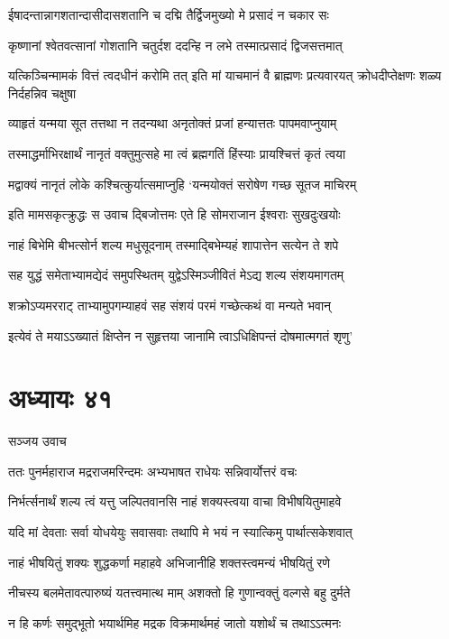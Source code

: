 \twolineshloka
{ईषादन्तान्नागशतान्दासीदासशतानि च}
{दद्मि तैर्द्विजमुख्यो मे प्रसादं न चकार सः}


\twolineshloka
{कृष्णानां श्वेतवत्सानां गोशतानि चतुर्दश}
{ददन्हि न लभे तस्मात्प्रसादं द्विजसत्तमात्}


\threelineshloka
{यत्किञ्चिन्मामकं वित्तं त्वदधीनं करोमि तत्}
{इति मां याचमानं वै ब्राह्मणः प्रत्यवारयत्}
{क्रोधदीप्तेक्षणः शळ्य निर्दहन्निव चक्षुषा}


\twolineshloka
{व्याहृतं यन्मया सूत तत्तथा न तदन्यथा}
{अनृतोक्तं प्रजां हन्यात्ततः पापमवाप्नुयाम्}


\twolineshloka
{तस्माद्धर्माभिरक्षार्थं नानृतं वक्तुमुत्सहे}
{मा त्वं ब्रह्मगतिं हिंस्याः प्रायश्चित्तं कृतं त्वया}


\twolineshloka
{मद्वाक्यं नानृतं लोके कश्चित्कुर्यात्समाप्नुहि}
{`यन्मयोक्तं सरोषेण गच्छ सूतज माचिरम्}


\twolineshloka
{इति मामसकृत्क्रुद्धः स उवाच द्बिजोत्तमः}
{एते हि सोमराजान ईश्वराः सुखदुःखयोः}


\twolineshloka
{नाहं बिभेमि बीभत्सोर्न शल्य मधुसूदनाम्}
{तस्माद्बिभेम्यहं शापात्तेन सत्येन ते शपे}


\twolineshloka
{सह युद्धं समेताभ्यामद्येदं समुपस्थितम्}
{युद्वेऽस्मिञ्जीवितं मेऽद्य शल्य संशयमागतम्}


\twolineshloka
{शक्रोऽप्यमरराट् ताभ्यामुपगम्याहवं सह}
{संशयं परमं गच्छेत्कथं वा मन्यते भवान्}


\twolineshloka
{इत्येवं ते मयाऽऽख्यातं क्षिप्तेन न सुहृत्तया}
{जानामि त्वाऽधिक्षिपन्तं दोषमात्मगतं शृणु'}


\chapter{अध्यायः ४१}
\twolineshloka
{सञ्जय उवाच}
{}


\twolineshloka
{ततः पुनर्महाराज मद्रराजमरिन्दमः}
{अभ्यभाषत राधेयः सन्निवार्योत्तरं वचः}


\twolineshloka
{निर्भर्त्सनार्थं शल्य त्वं यत्तु जल्पितवानसि}
{नाहं शक्यस्त्वया वाचा विभीषयितुमाहवे}


\twolineshloka
{यदि मां देवताः सर्वा योधयेयुः सवासवाः}
{तथापि मे भयं न स्यात्किमु पार्थात्सकेशवात्}


\twolineshloka
{नाहं भीषयितुं शक्यः शुद्धकर्णा महाहवे}
{अभिजानीहि शक्तस्त्वमन्यं भीषयितुं रणे}


\twolineshloka
{नीचस्य बलमेतावत्पारुष्यं यतत्त्वमात्थ माम्}
{अशक्तो हि गुणान्वक्तुं वल्गसे बहु दुर्मते}


\twolineshloka
{न हि कर्णः समुद्भूतो भयार्थमिह मद्रक}
{विक्रमार्थमहं जातो यशोर्थं च तथाऽऽत्मनः}


